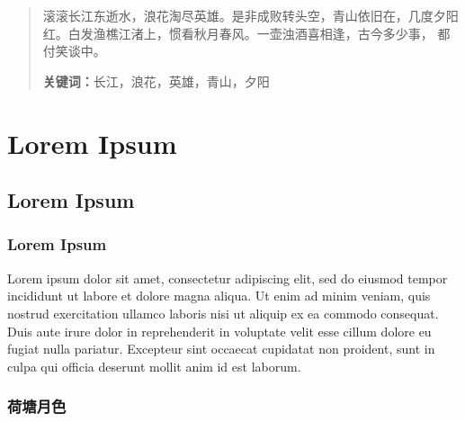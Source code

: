 \documentclass[twoside, UTF8, a4paper]{ctexart}
\numberwithin{figure}{section}
\numberwithin{table}{section}
\numberwithin{equation}{section}
\begin{document}
\clearpage
{}



\thispagestyle{empty}

\vspace*{15mm}
\begin{abstract}

滚滚长江东逝水，浪花淘尽英雄。是非成败转头空，青山依旧在，几度夕阳红。白发渔樵江渚上，惯看秋月春风。一壶浊酒喜相逢，古今多少事， 都付笑谈中。

\noindent \textbf{关键词：}长江，浪花，英雄，青山，夕阳

\end{abstract}

\restoregeometry


\clearpage
{}

\clearpage
\setcounter{tocdepth}{3}
\tableofcontents

\clearpage
\setlength{\parskip}{4pt}
\pagestyle{fancy}
\fancyhf{}
\renewcommand{\headrulewidth}{0.3pt}
\fancyhead[LE]{\leftmark}
\fancyfoot[CF]{\thepage}
\setcounter{page}{1}

\section{Lorem Ipsum}
\subsection{Lorem Ipsum}
\subsubsection{Lorem Ipsum}

Lorem ipsum dolor sit amet, consectetur adipiscing elit, sed do eiusmod tempor incididunt ut labore et dolore magna aliqua. Ut enim ad minim veniam, quis nostrud exercitation ullamco laboris nisi ut aliquip ex ea commodo consequat. Duis aute irure dolor in reprehenderit in voluptate velit esse cillum dolore eu fugiat nulla pariatur. Excepteur sint occaecat cupidatat non proident, sunt in culpa qui officia deserunt mollit anim id est laborum.

\subsubsection{荷塘月色}
\end{document}

